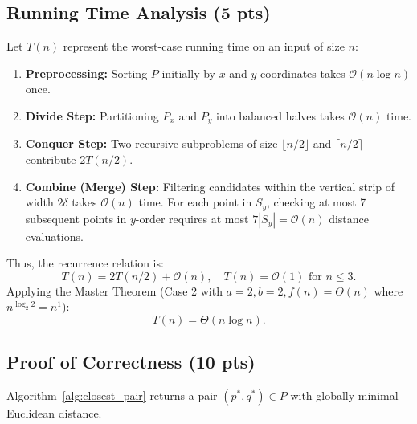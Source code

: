 \subsection{Running Time Analysis (5 pts)}
Let $T(n)$ represent the worst-case running time on an input of size $n$:
\begin{enumerate}
    \item \textbf{Preprocessing:} Sorting $P$ initially by $x$ and $y$ coordinates takes $\mathcal{O}(n \log n)$ once.
    \item \textbf{Divide Step:} Partitioning $P_x$ and $P_y$ into balanced halves takes $\mathcal{O}(n)$ time.
    \item \textbf{Conquer Step:} Two recursive subproblems of size $\lfloor n/2 \rfloor$ and $\lceil n/2 \rceil$ contribute $2 T(n/2)$.
    \item \textbf{Combine (Merge) Step:} Filtering candidates within the vertical strip of width $2\delta$ takes $\mathcal{O}(n)$ time. For each point in $S_y$, checking at most 7 subsequent points in $y$-order requires at most $7 |S_y| = \mathcal{O}(n)$ distance evaluations.
\end{enumerate}
Thus, the recurrence relation is:
\begin{equation}
T(n) = 2 T(n/2) + \mathcal{O}(n), \quad T(n) = \mathcal{O}(1) \text{ for } n \le 3.
\end{equation}
Applying the Master Theorem (Case 2 with $a=2, b=2, f(n) = \Theta(n)$ where $n^{\log_2 2} = n^1$):
\begin{equation}
T(n) = \Theta(n \log n).
\end{equation}

\subsection{Proof of Correctness (10 pts)}
\begin{theorem}
Algorithm~\ref{alg:closest_pair} returns a pair $(p^*, q^*) \in P$ with globally minimal Euclidean distance.
\end{theorem}

